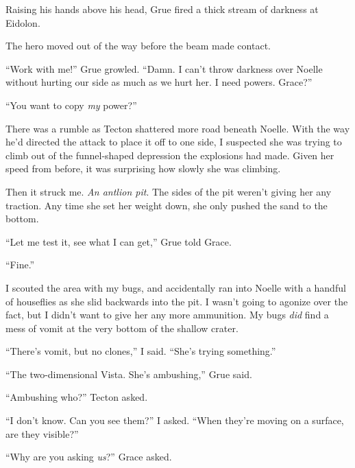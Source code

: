 Raising his hands above his head, Grue fired a thick stream of darkness at Eidolon.



The hero moved out of the way before the beam made contact.



``Work with me!'' Grue growled.  ``Damn.  I can't throw darkness over Noelle without hurting our side as much as we hurt her.  I need powers.  Grace?''



``You want to copy \emph{my} power?''



There was a rumble as Tecton shattered more road beneath Noelle.  With the way he'd directed the attack to place it off to one side, I suspected she was trying to climb out of the funnel-shaped depression the explosions had made.  Given her speed from before, it was surprising how slowly she was climbing.



Then it struck me. \emph{ An antlion pit}.  The sides of the pit weren't giving her any traction.  Any time she set her weight down, she only pushed the sand to the bottom.



``Let me test it, see what I can get,'' Grue told Grace.



``Fine.''



I scouted the area with my bugs, and accidentally ran into Noelle with a handful of houseflies as she slid backwards into the pit.  I wasn't going to agonize over the fact, but I didn't want to give her any more ammunition.  My bugs \emph{did} find a mess of vomit at the very bottom of the shallow crater.



``There's vomit, but no clones,'' I said.  ``She's trying something.''



``The two-dimensional Vista.  She's ambushing,'' Grue said.



``Ambushing who?''  Tecton asked.



``I don't know.  Can you see them?'' I asked.  ``When they're moving on a surface, are they visible?''



``Why are you asking \emph{us}?'' Grace asked.



